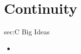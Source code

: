 \chapter{Continuity}
\label{chap:C}

\begin{bigideas}{sec:C Big Ideas}
\begin{itemize}
  \item 
\end{itemize}
\end{bigideas}